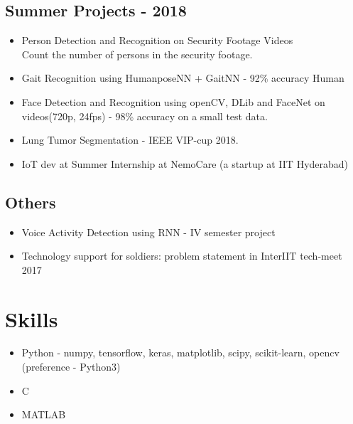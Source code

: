 \documentclass[11pt]{article} %
\begin{document}
\subsection{Summer Projects - 2018}
\begin{itemize}
    \item Person Detection and Recognition on Security Footage Videos \\ 
    Count the number of persons in the security footage. 
    \item Gait Recognition using HumanposeNN + GaitNN - 92\% accuracy
    Human
    \item Face Detection and Recognition using openCV, DLib and FaceNet on videos(720p, 24fps) - 98\% accuracy on a small test data.
    \item Lung Tumor Segmentation - IEEE VIP-cup 2018. 
    \item IoT dev at Summer Internship at NemoCare  (a startup at IIT Hyderabad)
\end{itemize}

\subsection{Others}
\begin{itemize}
    \item Voice Activity Detection using RNN - IV semester project
    \item Technology support for soldiers: problem statement in InterIIT tech-meet 2017
\end{itemize}

\hline

\section{Skills}

{
\begin{itemize}
    \item Python - numpy, tensorflow, keras, matplotlib, scipy, scikit-learn, opencv \\ (preference - Python3) 
    \item C 
    \item MATLAB
\end{itemize}
}

\end{document}
